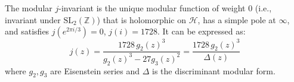 The modular $j$-invariant is the unique modular function of weight $0$ (i.e., invariant under $\mathrm{SL}_2(\mathbb{Z})$) that is holomorphic on $\mathcal{H}$, has a simple pole at $\infty$, and satisfies $j(e^{2\pi i/3}) = 0$, $j(i) = 1728$. It can be expressed as:
$$j(z) = \frac{1728 \, g_2(z)^3}{g_2(z)^3 - 27 g_3(z)^2} = \frac{1728 \, g_2(z)^3}{\Delta(z)}$$
where $g_2, g_3$ are Eisenstein series and $\Delta$ is the discriminant modular form.
